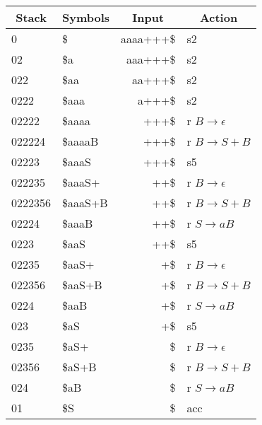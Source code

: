 \documentclass[onecolumn,oneside]{SUSTechHomework}
\begin{document}
    \begin{table}[H]
      \begin{tabular}{|l|l|r|l|}
      \hline
      \multicolumn{1}{|c|}{Stack} & \multicolumn{1}{c|}{Symbols} & \multicolumn{1}{c|}{Input} & \multicolumn{1}{c|}{Action} \\ \hline
      0       & \$       & aaaa+++\$ & s2                         \\ \hline
      02      & \$a      & aaa+++\$  & s2                         \\ \hline
      022     & \$aa     & aa+++\$   & s2                         \\ \hline
      0222    & \$aaa    & a+++\$    & s2                         \\ \hline
      02222   & \$aaaa   & +++\$     & r $B \rightarrow \epsilon$ \\ \hline
      022224  & \$aaaaB  & +++\$     & r $B \rightarrow S+B$      \\ \hline
      02223   & \$aaaS   & +++\$     & s5                         \\ \hline
      022235  & \$aaaS+  & ++\$      & r $B \rightarrow \epsilon$ \\ \hline
      0222356 & \$aaaS+B & ++\$      & r $B \rightarrow S+B$      \\ \hline
      02224   & \$aaaB   & ++\$      & r $S \rightarrow aB$       \\ \hline
      0223    & \$aaS    & ++\$      & s5                         \\ \hline
      02235   & \$aaS+   & +\$       & r $B \rightarrow \epsilon$ \\ \hline
      022356  & \$aaS+B  & +\$       & r $B \rightarrow S+B$      \\ \hline
      0224    & \$aaB    & +\$       & r $S \rightarrow aB$       \\ \hline
      023     & \$aS     & +\$       & s5                         \\ \hline
      0235    & \$aS+    & \$        & r $B \rightarrow \epsilon$ \\ \hline
      02356   & \$aS+B   & \$        & r $B \rightarrow S+B$      \\ \hline
      024     & \$aB     & \$        & r $S \rightarrow aB$       \\ \hline
      01      & \$S      & \$        & acc                        \\ \hline
      \end{tabular}
      \end{table}
\end{document}
